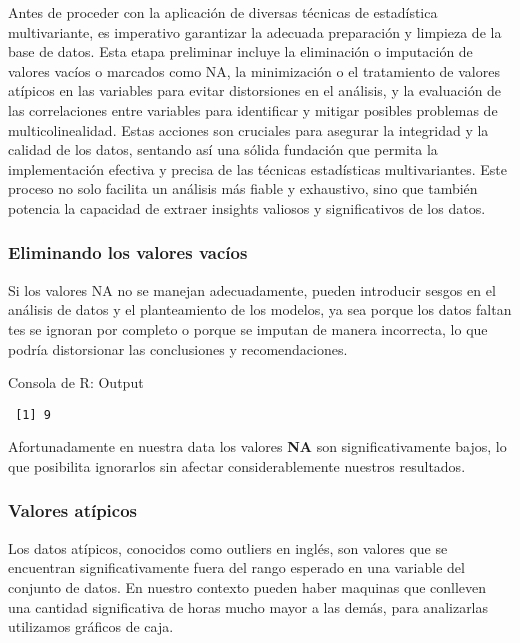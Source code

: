 \documentclass[
  11pt,
  bookmarksnumbered]{article}
\begin{document}
Antes de proceder con la aplicación de diversas técnicas de estadística multivariante, es imperativo garantizar la adecuada preparación y limpieza de la base de datos.
Esta etapa preliminar incluye la eliminación o imputación de valores vacíos o marcados como NA, la minimización o el tratamiento de valores atípicos en las variables para evitar distorsiones en el análisis, y la evaluación de las correlaciones entre variables para identificar y mitigar posibles problemas de multicolinealidad.
Estas acciones son cruciales para asegurar la integridad y la calidad de los datos, sentando así una sólida fundación que permita la implementación efectiva y precisa de las técnicas estadísticas multivariantes.
Este proceso no solo facilita un análisis más fiable y exhaustivo, sino que también potencia la capacidad de extraer insights valiosos y significativos de los datos.

\hypertarget{eliminando-los-valores-vacuxedos}{%
\subsubsection{Eliminando los valores vacíos}\label{eliminando-los-valores-vacuxedos}}

Si los valores NA no se manejan adecuadamente, pueden introducir sesgos en el análisis de datos y el planteamiento de los modelos, ya sea porque los datos faltan tes se ignoran por completo o porque se imputan de manera incorrecta, lo que podría distorsionar las conclusiones y recomendaciones.

\begin{ROut}{Consola de R: Output~\thetcbcounter}
                \begin{footnotesize}
                \begin{verbatim} [1] 9
 \end{verbatim}
                \end{footnotesize}
                \end{ROut}

Afortunadamente en nuestra data los valores \textbf{NA} son significativamente bajos, lo que posibilita ignorarlos sin afectar considerablemente nuestros resultados.

\hypertarget{valores-atuxedpicos}{%
\subsubsection{Valores atípicos}\label{valores-atuxedpicos}}

Los datos atípicos, conocidos como outliers en inglés, son valores que se encuentran significativamente fuera del rango esperado en una variable del conjunto de datos.
En nuestro contexto pueden haber maquinas que conlleven una cantidad significativa de horas mucho mayor a las demás, para analizarlas utilizamos gráficos de caja.
\end{document}
